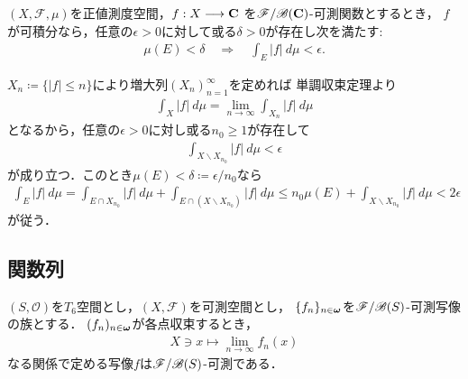 	\begin{screen}
		\begin{thm}[可積分なら積分値を一様に小さくできる]\label{thm:integrable_intvalue_uniformly_shrinking}
			$(X,\mathscr{F},\mu)$を正値測度空間，$f:X \longrightarrow \mathbf{C}$
			を$\mathscr{F}/\mathscr{B}(\mathbf{C})$-可測関数とするとき，
			$f$が可積分なら，任意の$\epsilon > 0$に対して或る$\delta > 0$が存在し次を満たす:
			\begin{align}
				\mu(E) < \delta \quad \Longrightarrow \quad \int_E |f|\ d\mu < \epsilon.
			\end{align}
		\end{thm}
	\end{screen}
	
	\begin{prf}
		$X_n \coloneqq \{|f| \leq n\}$により増大列$(X_n)_{n=1}^\infty$を定めれば
		単調収束定理より
		\begin{align}
			\int_X |f|\ d\mu = \lim_{n \to \infty} \int_{X_n} |f|\ d\mu
		\end{align}
		となるから，任意の$\epsilon > 0$に対し或る$n_0 \geq 1$が存在して
		\begin{align}
			\int_{X \backslash X_{n_0}} |f|\ d\mu < \epsilon
		\end{align}
		が成り立つ．このとき$\mu(E) < \delta \coloneqq \epsilon/n_0$なら
		\begin{align}
			\int_E |f|\ d\mu
			= \int_{E \cap X_{n_0}} |f|\ d\mu + \int_{E \cap (X \backslash X_{n_0})} |f|\ d\mu
			\leq n_0 \mu(E) + \int_{X \backslash X_{n_0}} |f|\ d\mu
			< 2\epsilon
		\end{align}
		が従う．
		\QED
	\end{prf}
	
	\subsection{関数列}
		
		\begin{screen}
			\begin{thm}[$T_6$空間に値を取る可測写像列の各点極限で定める写像は可測]
			\label{lem:measurability_metric_space}
				$(S,\mathscr{O})$を$T_6$空間とし，$(X,\mathscr{F})$を可測空間とし，
				$\{f_n\}_{n \in {\boldsymbol \omega}}$を$\mathscr{F}/\mathscr{B}(S)$-可測写像の族とする．
				$(f_n)_{n \in {\boldsymbol \omega}}$が各点収束するとき，
				\begin{align}
					X \ni x \longmapsto \lim_{n \to \infty} f_n(x)
				\end{align}
				なる関係で定める写像$f$は$\mathscr{F}/\mathscr{B}(S)$-可測である．
			\end{thm}
		\end{screen}
	
